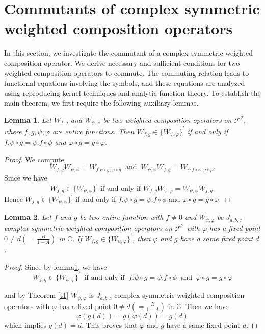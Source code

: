 \documentclass[10pt,a4paper]{amsart}
\newtheorem{lemma}{Lemma}
\numberwithin{equation}{section}
\begin{document}
\section{Commutants of complex symmetric weighted composition operators}\label{sec:prelimi}
In this section, we investigate the commutant of a complex symmetric weighted composition operator. We derive necessary and sufficient conditions for two weighted composition operators to commute. The commuting relation leads to functional equations involving the symbols, and these equations are analyzed using reproducing kernel techniques and analytic function theory. To establish the main theorem, we first require the following auxiliary lemmas.
\begin{lemma}\label{1l}
    Let $W_{f,g}$ and  $W_{\psi, \varphi}$ be two weighted composition operators on $\mathcal{F}^{2}$, where $f, g, \psi, \varphi$ are entire functions. Then $W_{f,g}\in \{W_{\psi, \varphi}\}^{'}$ if and only if $f.\psi \circ g =\psi .f\circ \phi$ and $\varphi \circ g = g \circ \varphi$.
\end{lemma}
\begin{proof}
    We compute
    $$W_{f,g}W_{\psi, \varphi}= W_{f.\psi \circ g , \varphi \circ g} ~\text{ and }~ W_{\psi, \varphi}W_{f,g}= W_{\psi. f\circ \varphi , g\circ \varphi}. $$ Since we have
    $$W_{f,g}\in \{W_{\psi, \varphi}\}^{'} \text{ if and only if } W_{f,g}W_{\psi, \varphi}= W_{\psi, \varphi}W_{f,g}.$$
    Hence $W_{f,g}\in \{W_{\psi, \varphi}\}^{'}$
    if and only if $f.\psi \circ g =\psi .f\circ \phi$ and $\varphi \circ g = g \circ \varphi$.
\end{proof}
\begin{lemma}\label{l2} 
Let $f$ and $g$ be two entire function with $f\neq 0$ and $W_{\psi, \varphi}$ be $J_{a,b,c}$-complex symmetric weighted  composition operators on $\mathcal{F}^{2}$ with $\varphi$ has a fixed point 
$0\neq d(=\frac{B}{1-A})$ in $\mathbb{C}$. If $W_{f,g} \in \{W_{\psi, \varphi}\}^{'}$, then  $\varphi$ and $g$ have a same fixed point $d$.
\end{lemma}
\begin{proof}
   Since by lemma\ref{1l}, we have 
   $$W_{f,g} \in \{W_{\psi, \varphi}\}^{'} ~\text{ if and only if }~ f.\psi \circ g =\psi .f\circ \phi ~\text{ and }~ \varphi \circ g = g \circ \varphi $$


   and by Theorem \ref{t1} $W_{\psi, \varphi}$ is $J_{a,b,c}$-complex symmetric weighted  composition operators with $\varphi$ has a fixed point 
$0\neq d(=\frac{B}{1-A})$ in $\mathbb{C}$. Then we have 
$$\varphi(g(d)) = g (\varphi(d))= g(d)$$
which implies $g(d)=d$. This proves that $\varphi$ and $g$ have a same fixed point $d$.
\end{proof}
\end{document}
